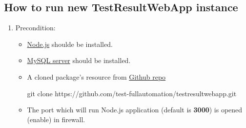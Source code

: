 \subsection{How to run new TestResultWebApp instance}
\begin{enumerate}

\item Precondition:
\begin{itemize}
\item \href{https://nodejs.org/en/}{Node.js} shoulde be installed.
\item \href{https://dev.mysql.com/downloads/mysql/}{MySQL server} should be
      installed.
\item A cloned package's resource from
      \href{https://github.com/test-fullautomation/testresultwebapp}
      {Github repo}
\begin{robotlog}
git clone https://github.com/test-fullautomation/testresultwebapp.git
\end{robotlog}
\item The port which will run Node.js application (default is \textbf{3000}) is
      opened (enable) in firewall.

\end{itemize}


\end{enumerate}
